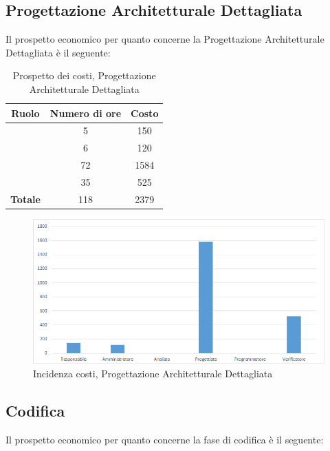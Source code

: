\subsection{Progettazione Architetturale Dettagliata}
Il prospetto economico per quanto concerne la Progettazione Architetturale Dettagliata è il seguente:


\begin{table}[H]
	\begin{center}
		\begin{tabular}{|c|c|c|}
			\hline
			\textbf{Ruolo}	& \textbf{Numero di ore} & \textbf{Costo} \\
			\hline
			\Res	&	5  &	150	\\
			\hline
			\Amm	&	6  &	120	\\
			\hline
			\Prog	&	72  &	1584	\\
			\hline
			\Ver	&	35  &	525	\\
			\hline
			\textbf{Totale}  &	118 &	2379	\\
			\hline
		\end{tabular}
	\end{center}
	\caption{Prospetto dei costi, Progettazione Architetturale Dettagliata }
\end{table}

\begin{figure}[H]
	\centering
	\includegraphics[scale=0.6]{img/8-3.png}
	\caption{Incidenza costi, Progettazione Architetturale Dettagliata}
\end{figure}

\subsection{Codifica}
Il prospetto economico per quanto concerne la fase di codifica è il seguente:


